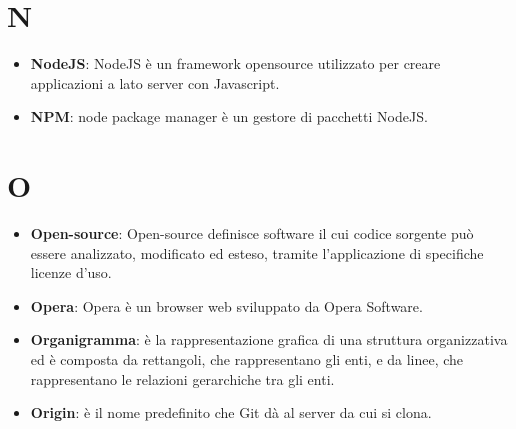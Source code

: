 \documentclass[a4paper, oneside, openany, dvipsnames, table]{article}
\begin{document}
\section{N}
\begin{itemize}
\item \textbf{NodeJS}: NodeJS è un framework opensource utilizzato per creare applicazioni a lato server con Javascript.
\item \textbf{NPM}: node package manager è un gestore di pacchetti NodeJS.
\end{itemize}

\section{O}
\begin{itemize}
\item \textbf{Open-source}: Open-source definisce software il cui codice sorgente può essere analizzato, modificato ed esteso, tramite l'applicazione di specifiche licenze d'uso.
\item \textbf{Opera}: Opera è un browser web sviluppato da Opera Software.
\item \textbf{Organigramma}: è la rappresentazione grafica di una struttura organizzativa ed è composta da rettangoli, che rappresentano gli enti, e da linee, che rappresentano le relazioni gerarchiche tra gli enti.
\item \textbf{Origin}: è il nome predefinito che Git dà al server da cui si clona.
\end{itemize}
\end{document}
